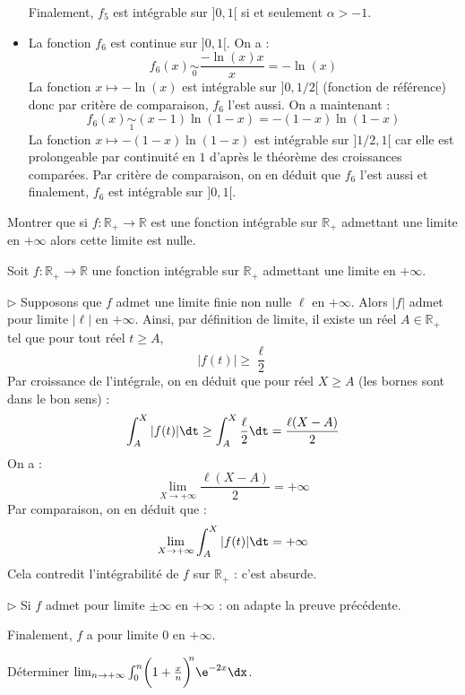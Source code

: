 \documentclass[a4paper,10pt]{report}
\begin{document}
\begin{itemize}
\medskip

\noindent Finalement, $f_5$ est intégrable sur $]0,1[$ si et seulement $\alpha>-1$.
 \item La fonction $f_6$ est continue sur $]0,1[$. On a :
 $$f_6(x) \underset{0}{\sim} \dfrac{- \ln(x) x}{x} = - \ln(x)$$
 La fonction $x \mapsto - \ln(x)$ est intégrable sur $]0,1/2[$ (fonction de référence) donc par critère de comparaison, $f_6$ l'est aussi. On a maintenant :
 $$ f_6(x) \underset{1}{\sim} (x-1) \ln(1-x) = - (1-x)\ln(1-x)$$
 La fonction $x \mapsto -(1-x)\ln(1-x)$ est intégrable sur $]1/2,1[$ car elle est prolongeable par continuité en $1$ d'après le théorème des croissances comparées. Par critère de comparaison, on en déduit que $f_6$ l'est aussi et finalement, $f_6$ est intégrable sur $]0,1[$.
\end{itemize}

\begin{Exa} Montrer que si $f : \mathbb{R}_+ \rightarrow \mathbb{R}$ est une fonction intégrable sur $\mathbb{R}_+$ admettant une limite en $+ \infty$ alors cette limite est nulle. 
\end{Exa} 

\corr Soit $f : \mathbb{R}_+ \rightarrow \mathbb{R}$ une fonction intégrable sur $\mathbb{R}_+$ admettant une limite en $+ \infty$. 

\medskip

\noindent $\rhd$ Supposons que $f$ admet une limite finie non nulle $\ell$ en $+ \infty$. Alors $\vert f \vert $ admet pour limite $\vert \ell \vert$ en $+ \infty$. Ainsi, par définition de limite, il existe un réel $A \in \mathbb{R}_+$ tel que pour tout réel $t \geq A$,
$$ \vert f(t) \vert \geq \dfrac{\ell}{2}$$
Par croissance de l'intégrale, on en déduit que pour réel $X \geq A$ (les bornes sont dans le bon sens) : 
$$ \int_A^{X} \vert f(t) \vert \dt \geq \int_A^{X} \dfrac{\ell}{2} \dt = \dfrac{\ell(X-A)}{2}$$
On a :
$$ \lim_{X \rightarrow + \infty} \dfrac{\ell(X-A)}{2} = + \infty$$
Par comparaison, on en déduit que :
$$  \lim_{X \rightarrow + \infty} \int_A^{X} \vert f(t) \vert \dt = + \infty$$
Cela contredit l'intégrabilité de $f$ sur $\mathbb{R}_+$ : c'est absurde.

\medskip

\noindent $\rhd$ Si $f$ admet pour limite $\pm \infty$ en $+ \infty$ : on adapte la preuve précédente.

\medskip

\noindent Finalement, $f$ a pour limite $0$ en $+ \infty$.


\begin{Exa} Déterminer $\lim_{n \to + \infty} \int_{0}^{n} \biggl( 1 + \frac{x}{n} \biggr)^{\!\!n} \e^{ - 2x} \dx$.
\end{Exa}
\end{document}

